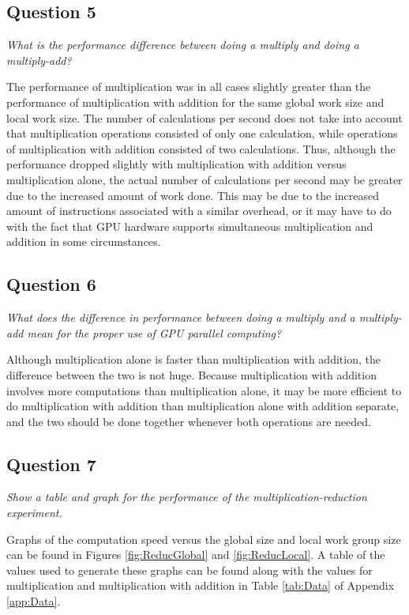 \documentclass{article}
\begin{document}
\subsection*{Question 5}
\textit{What is the performance difference between doing a multiply and doing a multiply-add?}

The performance of multiplication was in all cases slightly greater than the performance of multiplication with addition for the same global work size and local work size.  The number of calculations per second does not take into account that multiplication operations consisted of only one calculation, while operations of multiplication with addition consisted of two calculations.  Thus, although the performance dropped slightly with multiplication with addition versus multiplication alone, the actual number of calculations per second may be greater due to the increased amount of work done.  This may be due to the increased amount of instructions associated with a similar overhead, or it may have to do with the fact that GPU hardware supports simultaneous multiplication and addition in some circumstances.

\subsection*{Question 6}
\textit{What does the difference in performance between doing a multiply and a multiply-add mean for the proper use of GPU parallel computing?}

Although multiplication alone is faster than multiplication with addition, the difference between the two is not huge.  Because multiplication with addition involves more computations than multiplication alone, it may be more efficient to do multiplication with addition than multiplication alone with addition separate, and the two should be done together whenever both operations are needed.

\newpage
\subsection*{Question 7}
\textit{Show a table and graph for the performance of the multiplication-reduction experiment.}

Graphs of the computation speed versus the global size and local work group size can be found in Figures \ref{fig:ReducGlobal} and \ref{fig:ReducLocal}.  A table of the values used to generate these graphs can be found along with the values for multiplication and multiplication with addition in Table \ref{tab:Data} of Appendix \ref{app:Data}.
\end{document}
